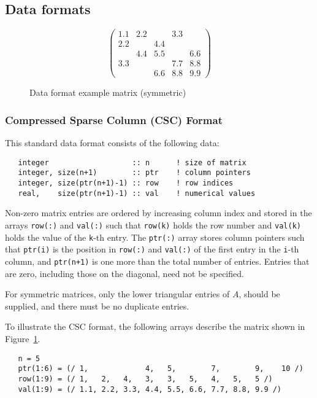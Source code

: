 \subsection{Data formats} \label{dataformats}

\begin{figure}
   \caption{ \label{format eg}
      Data format example matrix (symmetric)
   }
   $$
      \left( \begin{array}{ccccc}
         1.1 & 2.2 &     & 3.3 &     \\
         2.2 &     & 4.4 &     &     \\
             & 4.4 & 5.5 &     & 6.6 \\
         3.3 &     &     & 7.7 & 8.8 \\
             &     & 6.6 & 8.8 & 9.9
      \end{array} \right)
   $$
\end{figure}

\subsubsection{Compressed Sparse Column (CSC) Format} \label{cscformat}
This standard data format consists of the following data:
\begin{verbatim}
   integer                   :: n      ! size of matrix
   integer, size(n+1)        :: ptr    ! column pointers
   integer, size(ptr(n+1)-1) :: row    ! row indices
   real,    size(ptr(n+1)-1) :: val    ! numerical values
\end{verbatim}
Non-zero matrix entries are ordered by increasing column index and stored in
the arrays \texttt{row(:)} and \texttt{val(:)} such that \texttt{row(k)} holds
the row number and \texttt{val(k)} holds the value of the \texttt{k}-th entry.
The \texttt{ptr(:)} array stores column pointers such that \texttt{ptr(i)} is
the position in \texttt{row(:)} and \texttt{val(:)} of
the first entry in the \texttt{i}-th column, and \texttt{ptr(n+1)} is one more
than the total number of entries.
Entries that are zero, including those on the diagonal, need not be specified.

For symmetric matrices, only the lower triangular entries of $A$, should be
supplied, and there must be no duplicate entries. 

To illustrate the CSC format, the following arrays describe the matrix shown in
Figure~\ref{format eg}.
\begin{verbatim}
   n = 5
   ptr(1:6) = (/ 1,             4,   5,        7,        9,    10 /)
   row(1:9) = (/ 1,   2,   4,   3,   3,   5,   4,   5,   5 /)
   val(1:9) = (/ 1.1, 2.2, 3.3, 4.4, 5.5, 6.6, 7.7, 8.8, 9.9 /)
\end{verbatim}

